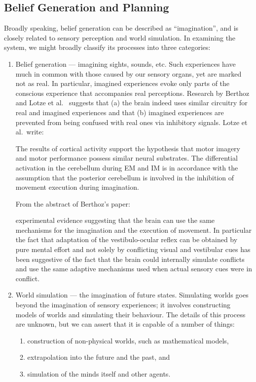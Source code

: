 \subsection{Belief Generation and Planning}\label{sec:worldSimulation}

Broadly speaking, belief generation can be described as ``imagination'', and is closely related to sensory perception and world simulation. In examining the system, we might broadly classify its processes into three categories:

\begin{enumerate}
	\item Belief generation --- imagining sights, sounds, etc. Such experiences have much in common with those caused by our sensory organs, yet are marked not as real. In particular, imagined experiences evoke only parts of the conscious experience that accompanies real perceptions. Research by Berthoz \cite{8713551} and Lotze et al.\ \cite{lotze1999} suggests that (a) the brain indeed uses similar circuitry for real and imagined experiences and that (b) imagined experiences are prevented from being confused with real ones via inhibitory signals. Lotze et al.\ write:
	\begin{emquote}
		The results of cortical activity support the hypothesis that motor imagery and motor performance possess similar neural substrates. The differential activation in the cerebellum during EM and IM is in accordance with the assumption that the posterior cerebellum is involved in the inhibition of movement execution during imagination.
	\end{emquote}
	
	From the abstract of Berthoz's paper:
	
	\begin{emquote}
		\ellipses experimental evidence suggesting that the brain can use the same mechanisms for the imagination and the execution of movement. In particular the fact that adaptation of the vestibulo-ocular reflex can be obtained by pure mental effort and not solely by conflicting visual and vestibular cues has been suggestive of the fact that the brain could internally simulate conflicts and use the same adaptive mechanisms used when actual sensory cues were in conflict.
	\end{emquote}
	
	\item World simulation --- the imagination of future states. Simulating worlds goes beyond the imagination of sensory experiences; it involves constructing models of worlds and simulating their behaviour. The details of this process are unknown, but we can assert that it is capable of a number of things:
	\begin{enumerate}[label={(\alph*)}]
		\item construction of non-physical worlds, such as mathematical models,
		\item extrapolation into the future and the past, and
		\item simulation of the minds itself and other agents.
	\end{enumerate}
	

\end{enumerate}

